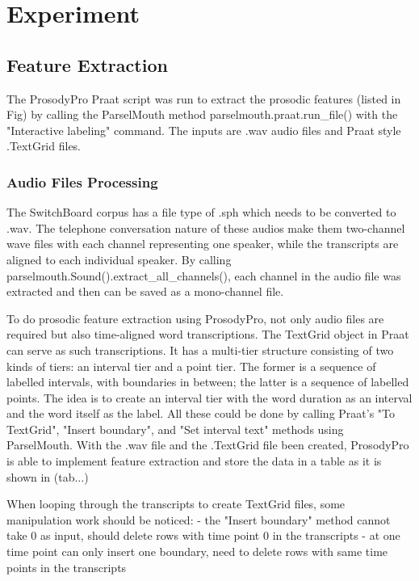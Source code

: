 \chapter{Experiment}

\section{Feature Extraction}

The ProsodyPro Praat script was run to extract the prosodic features (listed in Fig) by calling the ParselMouth method parselmouth.praat.run\_file() with the "Interactive labeling" command. The inputs are .wav audio files and Praat style .TextGrid files.  



\subsection{Audio Files Processing}
The SwitchBoard corpus has a file type of .sph which needs to be converted to .wav. The telephone conversation nature of these audios make them two-channel wave files with each channel representing one speaker, while the transcripts are aligned to each individual speaker. By calling parselmouth.Sound().extract\_all\_channels(), each channel in the audio file was extracted and then can be saved as a mono-channel file.

To do prosodic feature extraction using ProsodyPro, not only audio files are required but also time-aligned word transcriptions. The TextGrid object in Praat can serve as such transcriptions. It has a multi-tier structure consisting of two kinds of tiers: an interval tier and a point tier. The former is a sequence of labelled intervals, with boundaries in between; the latter is a sequence of labelled points. The idea is to create an interval tier with the word duration as an  interval and the word itself as the label. All these could be done by calling Praat's "To TextGrid", "Insert boundary", and "Set interval text" methods using ParselMouth. With the .wav file and the .TextGrid file been created, ProsodyPro is able to implement feature extraction and store the data in a table as it is shown in (tab...)

When looping through the transcripts to create TextGrid files, some manipulation work should be noticed:
- the "Insert boundary" method cannot take 0 as input, should delete rows with time point 0 in the transcripts
- at one time point can only insert one boundary, need to delete rows with same time points in the transcripts

